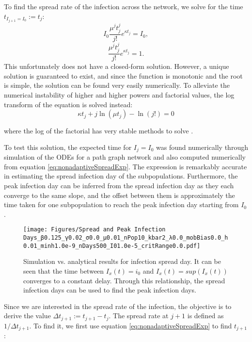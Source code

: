 To find the spread rate of the infection across the network, we solve for the time $t_{I_{j+1}=I_0} :=t_j$:
\begin{equation}
I_0 \frac{\mu^{j} t_j^{j}}{j!} e^{\kappa t_j} = I_0,
\end{equation}
\begin{equation}
\frac{\mu^{j} t_j^{j}}{j!} e^{\kappa t_j} = 1.
\label{eq:nonadaptiveSpreadExp}
\end{equation}
This unfortunately does not have a closed-form solution. However, a unique solution is guaranteed to exist, and since the function is monotonic and the root is simple, the solution can be found very easily numerically. To alleviate the numerical instability of higher and higher powers and factorial values, the log transform of the equation is solved instead:
\begin{equation}
\kappa t_j + j \ln(\mu t_j) - \ln(j!) = 0
\end{equation}

where the log of the factorial has very stable methods to solve \cite{C}.%

To test this solution, the expected time for $I_j = I_0$ was found numerically through simulation of the ODEs for a path graph network and also computed numerically from equation \ref{eq:nonadaptiveSpreadExp}. The expression is remarkably accurate in estimating the spread infection day of the subpopulations. Furthermore, the peak infection day can be inferred from the spread infection day as they each converge to the same slope, and the offset between them is approximately the time taken for one subpopulation to reach the peak infection day starting from $I_0$.

\begin{figure}[!ht]
    \centering
    \texttt{[image: Figures/Spread and Peak Infection Days\_β0.125\_γ0.02\_σ0.0\_μ0.01\_nPop10\_kbar2\_λ0.0\_mobBias0.0\_h0.01\_minh1.0e-9\_nDays500\_I01.0e-5\_critRange0.0.pdf]}
    \caption{\small Simulation vs. analytical results for infection spread day. It can be seen that the time between $I_x(t)=i_0$ and $I_x(t)=sup(I_x(t))$ converges to a constant delay. Through this relationship, the spread infection days can be used to find the peak infection days.}
    \label{fig:Spread-and-Peak-Infection-Days-non-adaptive}
\end{figure}

Since we are interested in the spread rate of the infection, the objective is to derive the value ${\Delta t}_{j+1} := t_{j+1}-t_j$. The spread rate at $j+1$ is defined as $1/{\Delta t}_{j+1}$. To find it, we first use equation \ref{eq:nonadaptiveSpreadExp} to find $t_{j+1}$:

